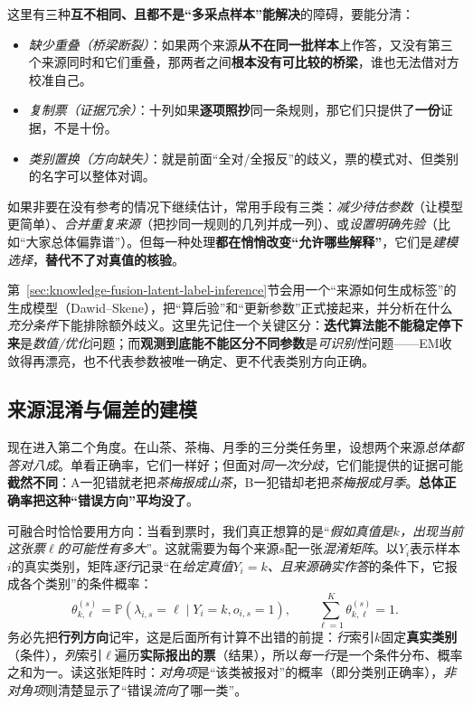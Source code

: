 这里有三种\textbf{互不相同、且都不是“多采点样本”能解决}的障碍，要能分清：
\begin{itemize}\item \emph{缺少重叠（桥梁断裂）}：如果两个来源\textbf{从不在同一批样本}上作答，又没有第三个来源同时和它们重叠，那两者之间\textbf{根本没有可比较的桥梁}，谁也无法借对方校准自己。\item \emph{复制票（证据冗余）}：十列如果\textbf{逐项照抄}同一条规则，那它们只提供了\textbf{一份}证据，不是十份。\item \emph{类别置换（方向缺失）}：就是前面“全对/全报反”的歧义，票的模式对、但类别的名字可以整体对调。\end{itemize}

如果非要在没有参考的情况下继续估计，常用手段有三类：\emph{减少待估参数}（让模型更简单）、\emph{合并重复来源}（把抄同一规则的几列并成一列）、或\emph{设置明确先验}（比如“大家总体偏靠谱”）。但每一种处理\textbf{都在悄悄改变“允许哪些解释”}，它们是\emph{建模选择}，\textbf{替代不了对真值的核验}。

第~\ref{sec:knowledge-fusion-latent-label-inference}节会用一个“来源如何生成标签”的生成模型（Dawid--Skene），把“算后验”和“更新参数”正式接起来，并分析在什么\emph{充分条件}下能排除额外歧义。这里先记住一个关键区分：\textbf{迭代算法能不能稳定停下来}是\emph{数值/优化}问题；而\textbf{观测到底能不能区分不同参数}是\emph{可识别性}问题——EM收敛得再漂亮，也不代表参数被唯一确定、更不代表类别方向正确。

\subsection{来源混淆与偏差的建模}
\label{sec:knowledge-fusion-confusion}

现在进入第二个角度。在山茶、茶梅、月季的三分类任务里，设想两个来源\emph{总体都答对八成}。单看正确率，它们一样好；但面对\emph{同一次分歧}，它们能提供的证据可能\textbf{截然不同}：A一犯错就老把\emph{茶梅报成山茶}，B一犯错却老把\emph{茶梅报成月季}。\textbf{总体正确率把这种“错误方向”平均没了}。

可融合时恰恰要用方向：当看到票时，我们真正想算的是“\emph{假如真值是$k$，出现当前这张票$\ell$的可能性有多大}”。这就需要为每个来源$s$配一张\emph{混淆矩阵}。以$Y_i$表示样本$i$的真实类别，矩阵\emph{逐行}记录“在\emph{给定真值$Y_i=k$、且来源确实作答}的条件下，它报成各个类别”的条件概率：
\begin{equation}
  \theta^{(s)}_{k,\ell}
  =\mathbb{P}(\lambda_{i,s}=\ell
    \mid Y_i=k,o_{i,s}=1),
  \qquad
  \sum_{\ell=1}^{K}\theta^{(s)}_{k,\ell}=1.
  \label{eq:knowledge-fusion-confusion-matrix}
\end{equation}
务必先把\textbf{行列方向}记牢，这是后面所有计算不出错的前提：\emph{行}索引$k$固定\textbf{真实类别}（条件），\emph{列}索引$\ell$遍历\textbf{实际报出的票}（结果），所以\emph{每一行}是一个条件分布、概率之和为一。读这张矩阵时：\emph{对角项}是“该类被报对”的概率（即分类别正确率），\emph{非对角项}则清楚显示了“错误\emph{流向}了哪一类”。

